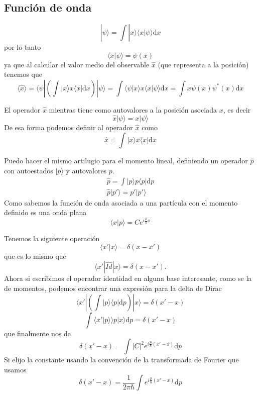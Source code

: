 \documentclass{book}
\numberwithin{equation}{section} %
\begin{document}
\subsection{Función de onda}

\begin{equation}
    |\psi \rangle = \int |x \rangle \langle x | \psi \rangle \mathrm{d}x
\end{equation}
por lo tanto
\begin{equation}
  \langle x|\psi\rangle = \psi(x) 
\end{equation}
ya que al calcular el valor medio del observable $\hat{x}$ (que representa a la posición) tenemos que
\begin{equation}
    \langle \hat{x} \rangle = \langle \psi | \left( \int |x \rangle x \langle x | \mathrm{d}x \right) | \psi \rangle = \int \langle \psi | x \rangle x \langle x | \psi \rangle \mathrm{d} x = \int x \psi(x) \psi^*(x) \mathrm{d}x
\end{equation}

El operador $\hat{x}$ mientras tiene como autovalores a la posición asociada $x$, es decir
\begin{equation}
    \hat{x} |\psi\rangle = x |\psi\rangle
\end{equation}
De esa forma podemos definir al operador $\hat{x}$ como 
\begin{equation}
\hat{x} = \int |x\rangle x \langle x | \mathrm{d}x
\label{eq:operador_x}
\end{equation}

Puedo hacer el mismo artilugio para el momento lineal, definiendo un operador $\hat{p}$ con autoestados $|p\rangle$ y autovalores $p$.
\begin{equation}
\begin{gathered}
\hat{p} = \int |p\rangle p \langle p | \mathrm{d}p\\
\hat{p} |p'\rangle = p' |p'\rangle
\end{gathered}
\end{equation}
Como sabemos la función de onda asociada a una partícula con el momento definido es una onda plana
\begin{equation}
\langle x | p \rangle = C e^{i \frac{p}{\hbar} x}
\end{equation}

Tenemos la siguiente operación
\[ \langle x' | x \rangle = \delta(x - x')\]
que es lo mismo que
\[ \langle x' | \hat{Id} | x \rangle = \delta(x - x').\]
Ahora si escribimos el operador identidad en alguna base interesante, como se la de momentos, podemos encontrar una expresión para la delta de Dirac
\[ \langle x' |\left( \int |p\rangle \langle p | \mathrm{d}p \right)| x \rangle = \delta(x' - x)\]
\[ \int \langle x' | p \rangle \rangle p | x \rangle \mathrm{d}p = \delta(x' - x)\]
que finalmente nos da
\[ \delta(x' - x) = \int |C|^2 e^{i \frac{p}{\hbar}(x' - x)} \mathrm{d}p\]
Si elijo la constante usando la convención de la transformada de Fourier que usamos
\begin{equation}
 \delta(x' - x) = \frac{1}{2\pi\hbar} \int e^{i \frac{p}{\hbar} (x' - x)} \mathrm{d}p
\end{equation}
\end{document}
